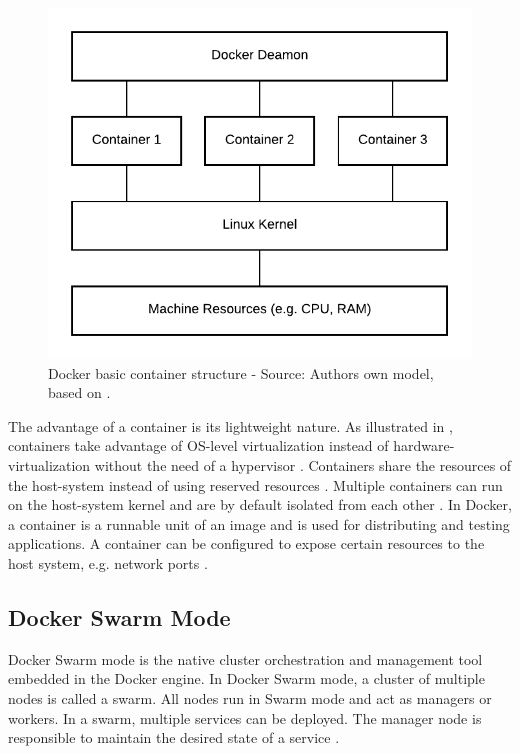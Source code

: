 \begin{figure}[h]
\centering
\includegraphics[scale=1]{images/04_technical_background/docker/container_structure}
\caption{Docker basic container structure - Source: Authors own model, based on \cite{Bullington2020Docker}.}
\label{fig:04_docker_container_container-structure}
\end{figure}

The advantage of a container is its lightweight nature. As illustrated in , containers take advantage of OS-level virtualization instead of hardware-virtualization without the need of a hypervisor \cite{Docker2020Docs, Nickoloff2019Docker}. Containers share the resources of the host-system instead of using reserved resources \cite{Bullington2020Docker}. Multiple containers can run on the host-system kernel and are by default isolated from each other \cite{Docker2020Docs}.
In Docker, a container is a runnable unit of an image and is used for distributing and testing applications. A container can be configured to expose certain resources to the host system, e.g. network ports \cite{Bullington2020Docker}.


\subsection{Docker Swarm Mode}
\label{subsec:04_docker_swarm}
Docker Swarm mode is the native cluster orchestration and management tool embedded in the Docker engine.
In Docker Swarm mode, a cluster of multiple nodes is called a swarm. All nodes run in Swarm mode and act as managers or workers.
In a swarm, multiple services can be deployed. The manager node is responsible to maintain the desired state of a service \cite{Docker2020Docs}.


